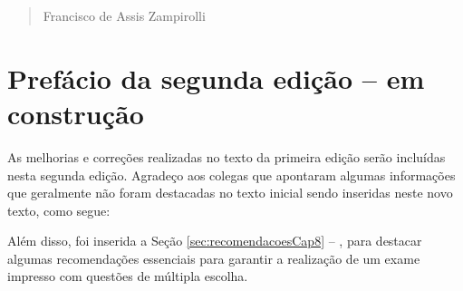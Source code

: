 \begin{verse}
    \vspace*{2mm}
	\begin{flushright}
		Francisco de Assis Zampirolli\\
            \date{7 de setembro de 2023}
	\end{flushright}
\end{verse}

\newpage

\section*{Prefácio da segunda edição -- em construção}

As melhorias e correções realizadas no texto da primeira edição serão incluídas nesta segunda edição. Agradeço aos colegas que apontaram algumas informações que geralmente não foram destacadas no texto inicial sendo inseridas neste novo texto, como segue:


Além disso, foi inserida a Seção \ref{sec:recomendacoesCap8} -- , para destacar algumas recomendações essenciais para garantir a realização de um exame impresso com questões de múltipla escolha.

